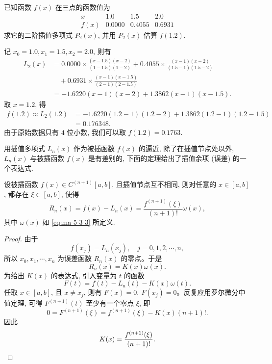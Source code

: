 \begin{example}\label{example:ma-5-3-16}
已知函数 $f(x)$ 在三点的函数值为
\[
\begin{array}{c|ccc}
  x & 1.0 & 1.5 & 2.0\\
  \hline
  f(x) & 0.0000 & 0.4055 & 0.6931
\end{array}
\]
求它的二阶插值多项式 $P_2(x)$, 并用 $P_2(x)$ 估算 $f(1.2)$.
\end{example}


\begin{solve}
记 $x_0=1.0,x_1=1.5,x_2=2.0$, 则有
\[
\begin{aligned}
  L_2(x)
  &=
  0.0000\times\frac{(x-1.5)(x-2)}{(1-1.5)(1-2)}
  +0.4055\times\frac{(x-1)(x-2)}{(1.5-1)(1.5-2)} \\
  &\quad
  +0.6931\times\frac{(x-1)(x-1.5)}{(2-1)(2-1.5)} \\
  &=
  -1.6220(x-1)(x-2)+1.3862(x-1)(x-1.5).
\end{aligned}
\]
取 $x=1.2$, 得
\[
\begin{aligned}
  f(1.2)\approx L_2(1.2)
  &=
  -1.6220(1.2-1)(1.2-2)
  +1.3862(1.2-1)(1.2-1.5) \\
  &=
  0.176348.
\end{aligned}
\]
由于原始数据只有 $4$ 位小数, 我们可以取 $f(1.2)=0.1763$.

用插值多项式 $L_n(x)$ 作为被插函数 $f(x)$ 的逼近, 除了在插值节点处以外, $L_n(x)$ 与被插函数 $f(x)$ 是有差别的, 下面的定理给出了插值余项 (误差) 的一个表达式.
\end{solve}


\begin{theorem}\label{theorem:ma-5-3-3}
设被插函数 $f(x)\in C^{(n+1)}[a,b]$, 且插值节点互不相同, 则对任意的 $x\in[a,b]$, 都存在 $\xi\in[a,b]$, 使得
\[
  R_n(x)=f(x)-L_n(x)=\frac{f^{(n+1)}(\xi)}{(n+1)!}\omega(x),
\]
其中 $\omega(x)$ 如 \eqref{eq:ma-5-3-3} 所定义.
\end{theorem}


\begin{proof}
由于
\[
  f(x_j)=L_n(x_j),\quad j=0,1,2,\cdots,n,
\]
所以 $x_0,x_1,\cdots,x_n$ 为误差函数 $R_n(x)$ 的零点。于是
\[
  R_n(x)=K(x)\omega(x).
\]
为给出 $K(x)$ 的表达式, 引入变量为 $t$ 的函数
\[
  F(t)=f(t)-L_n(t)-K(x)\omega(t).
\]
任取 $x\in[a,b]$, 且 $x\ne x_j$, 则有 $F(x)=0,\ F(x_j)=0$。反复应用罗尔微分中值定理, 可得 $F^{(n+1)}(t)$ 至少有一个零点 $\xi$, 即
\[
  0=F^{(n+1)}(\xi)=f^{(n+1)}(\xi)-K(x)(n+1)!.
\]
因此
\[
  K(x)=\frac{f^{(n+1)}(\xi)}{(n+1)!}.
\qedhere
\]
\end{proof}


